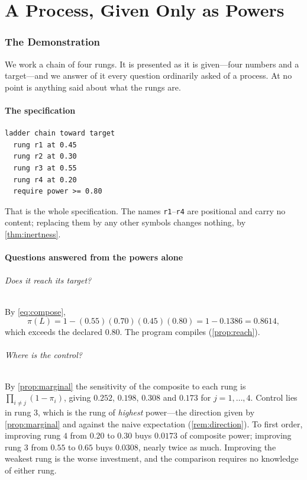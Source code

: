\documentclass[11pt,twocolumn,a4paper]{article}
\theoremstyle{plain}
\theoremstyle{definition}
\theoremstyle{remark}
\newcommand{\pow}{\pi}
\newcommand{\Lad}{L}
\begin{document}
\part{A Process, Given Only as Powers}
\label{part:demo}

\section{The Demonstration}
\label{sec:demo}

We work a chain of four rungs. It is presented as it is given---four numbers
and a target---and we answer of it every question ordinarily asked of a process.
At no point is anything said about what the rungs are.

\subsection{The specification}

\begin{lstlisting}[caption={A process, completely specified.},captionpos=b,label=lst:chain]
ladder chain toward target
  rung r1 at 0.45
  rung r2 at 0.30
  rung r3 at 0.55
  rung r4 at 0.20
  require power >= 0.80
\end{lstlisting}

That is the whole specification. The names \texttt{r1}--\texttt{r4} are
positional and carry no content; replacing them by any other symbols changes
nothing, by \cref{thm:inertness}.

\subsection{Questions answered from the powers alone}

\paragraph{Does it reach its target?}
By \cref{eq:compose},
\[
\pow(\Lad) = 1 - (0.55)(0.70)(0.45)(0.80) = 1 - 0.1386 = 0.8614,
\]
which exceeds the declared $0.80$. The program compiles
(\cref{prop:reach}).

\paragraph{Where is the control?}
By \cref{prop:marginal} the sensitivity of the composite to each rung is
$\prod_{i\neq j}(1-\pow_i)$, giving $0.252$, $0.198$, $0.308$ and $0.173$ for
$j = 1,\dots,4$. Control lies in rung $3$, which is the rung of \emph{highest}
power---the direction given by \cref{prop:marginal} and against the naive
expectation (\cref{rem:direction}). To first order, improving rung $4$ from
$0.20$ to $0.30$ buys $0.0173$ of composite power; improving rung $3$ from
$0.55$ to $0.65$ buys $0.0308$, nearly twice as much. Improving the weakest rung
is the worse investment, and the comparison requires no knowledge of either
rung.
\end{document}
